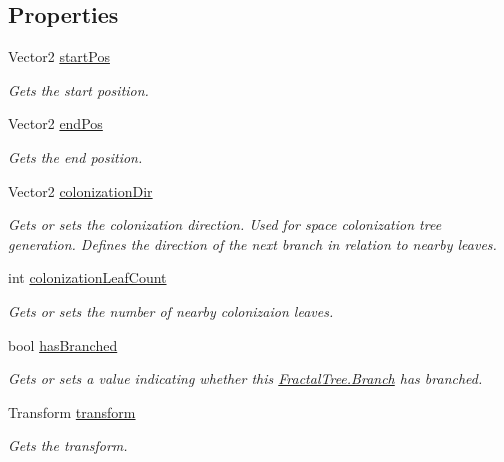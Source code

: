 \subsection*{Properties}
\begin{DoxyCompactItemize}
\item 
Vector2 \hyperlink{interface_fractal_tree_1_1_branch_a52b6d474fb483fb9e37e1c3fb8407ac5}{start\+Pos}
\begin{DoxyCompactList}\small\item\em Gets the start position. \end{DoxyCompactList}\item 
Vector2 \hyperlink{interface_fractal_tree_1_1_branch_a5fb0f25128777e86c137a98958f3072b}{end\+Pos}
\begin{DoxyCompactList}\small\item\em Gets the end position. \end{DoxyCompactList}\item 
Vector2 \hyperlink{interface_fractal_tree_1_1_branch_a1c83eb986e51a7c77b85b5d8dd68b8fc}{colonization\+Dir}
\begin{DoxyCompactList}\small\item\em Gets or sets the colonization direction. Used for space colonization tree generation. Defines the direction of the next branch in relation to nearby leaves. \end{DoxyCompactList}\item 
int \hyperlink{interface_fractal_tree_1_1_branch_a218b95e107b90de1f7e0587a95c53afc}{colonization\+Leaf\+Count}
\begin{DoxyCompactList}\small\item\em Gets or sets the number of nearby colonizaion leaves. \end{DoxyCompactList}\item 
bool \hyperlink{interface_fractal_tree_1_1_branch_a91cf75bd1bfc1d180be42ee4b461f3e8}{has\+Branched}
\begin{DoxyCompactList}\small\item\em Gets or sets a value indicating whether this \hyperlink{interface_fractal_tree_1_1_branch}{Fractal\+Tree.\+Branch} has branched. \end{DoxyCompactList}\item 
Transform \hyperlink{interface_fractal_tree_1_1_branch_a4063cbfa57dfa91075a67c124ae3a3ac}{transform}
\begin{DoxyCompactList}\small\item\em Gets the transform. \end{DoxyCompactList}\end{DoxyCompactItemize}


